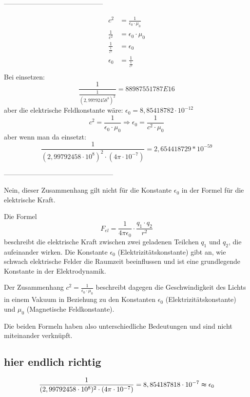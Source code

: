\documentclass[a4paper]{report}
\begin{document}
--------------------------------------------

\begin{align}
c^2 &= \frac{1}{\epsilon_0 \cdot \mu_0} \\ %
\frac{1}{c^2} &= \epsilon_0 \cdot \mu_0 \\ %
\frac{1}{\frac{1}{c^2}} &= \epsilon_0 \\ %
\epsilon_0 &= \frac{1}{\frac{1}{c^2}} \\ %
\end{align}
Bei einsetzen:
\begin{equation*}
  \frac{1}{\frac{1}{(2,99792458^8)^2}} = 88987551787 E16
\end{equation*}
aber die elektrische Feldkonstante wäre: $\epsilon_0 = 8,85418782\cdot 10^{-12}$
\[c^2 = \frac{1}{\epsilon_0\cdot\mu_0}
\Rightarrow \epsilon_0 = \frac{1}{c^2\cdot\mu_0}
\]
aber wenn man da einsetzt:
\[\frac{1}{(2,99792458\cdot 10^8)^2\cdot (4\pi\cdot 10^{-7})}= 2,654418729*10^{-59}\]

------------------------------------------------

Nein, dieser Zusammenhang gilt nicht für die Konstante $\epsilon_0$ in der Formel
für die elektrische Kraft.

Die Formel 
\begin{equation}
  F_{el}=\frac{1}{4π\epsilon_0}\cdot\frac{q_1\cdot q_2}{r^2}
\end{equation}beschreibt die elektrische Kraft zwischen zwei geladenen Teilchen $q_1$ und $q_2$,
die aufeinander wirken. Die Konstante $\epsilon_0$ (Elektrizitätskonstante) gibt
an, wie schwach elektrische Felder die Raumzeit beeinflussen und ist eine
grundlegende Konstante in der Elektrodynamik.

Der Zusammenhang $c^2=\frac{1}{\epsilon_0\cdot\mu_0}$ beschreibt dagegen die
Geschwindigkeit des Lichts in einem Vakuum in Beziehung zu den Konstanten
$\epsilon_0$ (Elektrizitätskonstante) und $\mu_0$ (Magnetische Feldkonstante).

Die beiden Formeln haben also unterschiedliche Bedeutungen und sind nicht
miteinander verknüpft.
\subsection{hier endlich richtig}
\begin{equation*}
  \frac{1}{(2,99792458\cdot10^8)^2\cdot(4\pi\cdot 10^{-7})} = 8,854187818\cdot 10^{-7} \thickapprox \epsilon_0
\end{equation*}
\clearpage
\end{document}
